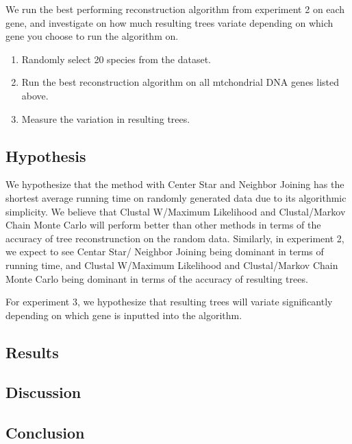 \documentclass[10pt,twocolumn]{article}
\begin{document}
We run the best performing reconstruction algorithm from experiment 2 on each gene, and 
investigate on how much resulting trees variate depending on which gene you choose to 
run the algorithm on. 

\begin{enumerate}
  \item Randomly select 20 species from the dataset.
  \item Run the best reconstruction algorithm on all mtchondrial DNA genes listed above.
  \item Measure the variation in resulting trees.
\end{enumerate}

\subsection*{Hypothesis}
We hypothesize that the method with Center Star and Neighbor Joining has the shortest average running
time on randomly generated data due to its algorithmic simplicity. We believe that Clustal W/Maximum Likelihood
and Clustal/Markov Chain Monte Carlo will perform better than other methods in terms of the accuracy of tree reconstrunction
on the random data. Similarly, in experiment 2, we expect to see Centar Star/ Neighbor Joining being dominant in terms of running time, and Clustal W/Maximum Likelihood and Clustal/Markov Chain Monte Carlo being dominant in terms of the accuracy of resulting trees.

For experiment 3, we hypothesize that resulting trees will variate significantly depending on which gene is inputted into the algorithm.  

\subsection*{Results}
\subsection*{Discussion}
\subsection*{Conclusion}



\end{document}
